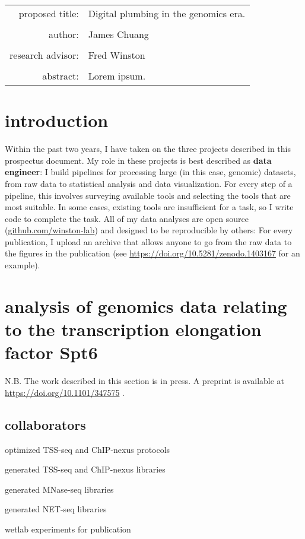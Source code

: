\documentclass[9pt, letterpaper]{article}
\begin{document}
\begin{titlepage}
\begin{tabular}{ r l }
 proposed title:   & Digital plumbing in the genomics era. \\
 		   & \\
 author:	   & James Chuang \\
 		   & \\
 research advisor: & Fred Winston \\
 		   & \\
 abstract:	   & Lorem ipsum.
\end{tabular}
\end{titlepage}

\tableofcontents
\newpage

\section{introduction}

Within the past two years, I have taken on the three projects described in this prospectus document. My role in these projects is best described as \textbf{data engineer}: I build pipelines for processing large (in this case, genomic) datasets, from raw data to statistical analysis and data visualization. For every step of a pipeline, this involves surveying available tools and selecting the tools that are most suitable. In some cases, existing tools are insufficient for a task, so I write code to complete the task. All of my data analyses are open source (\url{github.com/winston-lab}) and designed to be reproducible by others: For every publication, I upload an archive that allows anyone to go from the raw data to the figures in the publication (see \url{https://doi.org/10.5281/zenodo.1403167} for an example).

\section{analysis of genomics data relating to the transcription elongation factor Spt6}

N.B. The work described in this section is in press. A preprint is available at \url{https://doi.org/10.1101/347575} \cite{doris2018}.

\subsection{collaborators}

\begin{description}[align=right, labelwidth=5cm, noitemsep]
    \item [Steve Doris] optimized TSS-seq and ChIP-nexus protocols
    \item [] generated TSS-seq and ChIP-nexus libraries
    \item [Olga Viktorovskaya] generated MNase-seq libraries
    \item [Magdalenda Murawska] generated NET-seq libraries
    \item [Dan Spatt] wetlab experiments for publication
\end{description}
\end{document}

